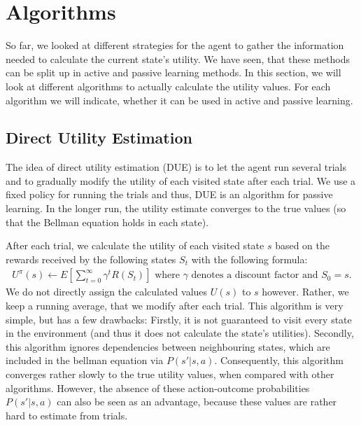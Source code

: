 \documentclass{llncs}
\begin{document}

\section{Algorithms}
So far, we looked at different strategies for the agent to gather the information needed to calculate the current state's utility. We have seen, that these methods can be split up in active and passive learning methods. In this section, we will look at different algorithms to actually calculate the utility values. For each algorithm we will indicate, whether it can be used in active and passive learning.

\subsection{Direct Utility Estimation}
The idea of direct utility estimation (DUE) is to let the agent run several trials and to gradually modify the utility of each visited state after each trial. We use a fixed policy for running the trials and thus, DUE is an algorithm for passive learning. In the longer run, the utility estimate converges to the true values (so that the Bellman equation holds in each state).\par

After each trial, we calculate the utility of each visited state $s$ based on the rewards received by the following states $S_t$  with the following formula:
\begin{align*}
U^{\pi}(s) \leftarrow E[\sum_{t=0}^{\infty}\gamma^{t}R(S_{t})]\text{ where }\gamma\text{ denotes a discount factor and }S_0 = s.
\end{align*}
We do not directly assign the calculated values $U(s)$ to $s$ however. Rather, we keep a running average, that we modify after each trial. This algorithm is very simple, but has a few drawbacks: Firstly, it is not guaranteed to visit every state in the environment (and thus it does not calculate the state's utilities). Secondly, this algorithm ignores dependencies between neighbouring states, which are included in the bellman equation via $P(s'|s,a)$. Consequently, this algorithm converges rather slowly to the true utility values, when compared with other algorithms. However, the absence of these action-outcome probabilities $P(s'|s,a)$ can also be seen as an advantage, because these values are rather hard to estimate from trials.
\end{document}
